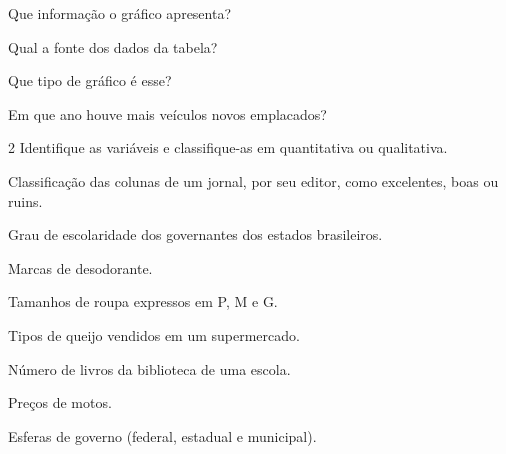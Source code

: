 \begin{escolha}
\item
  Que informação o gráfico apresenta?


\item
  Qual a fonte dos dados da tabela?


\item
  Que tipo de gráfico é esse?


\item
  Em que ano houve mais veículos novos emplacados?

\end{escolha}

\num{2} Identifique as variáveis e classifique-as em quantitativa 
ou qualitativa.

\begin{escolha}
\item
  Classificação das colunas de um jornal, por seu editor, como
  excelentes, boas ou ruins.


\item
  Grau de escolaridade dos governantes dos estados brasileiros.


\item
  Marcas de desodorante.


\item
  Tamanhos de roupa expressos em P, M e G.


\item
  Tipos de queijo vendidos em um supermercado.


\item
  Número de livros da biblioteca de uma escola.


\item
  Preços de motos.


\item
  Esferas de governo (federal, estadual e municipal).

\end{escolha}

